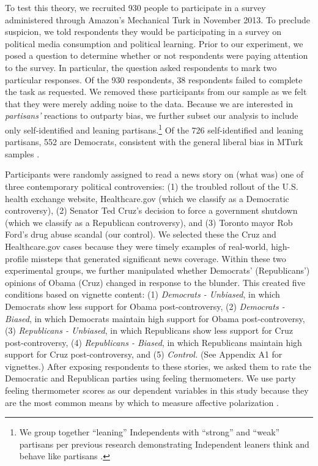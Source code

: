 \documentclass[12pt, letterpaper]{article}
\begin{document}
{To test this theory, we recruited 930 people to participate in a survey administered through Amazon's Mechanical Turk in November 2013. To preclude suspicion, we told respondents they would be participating in a survey on political media consumption and political learning. Prior to our experiment, we posed a question to determine whether or not respondents were paying attention to the survey. In particular, the question asked respondents to mark two particular responses. Of the 930 respondents, 38 respondents failed to complete the task as requested. We removed these participants from our sample as we felt that they were merely adding noise to the data. Because we are interested in \textit{partisans'} reactions to outparty bias, we further subset our analysis to include only self-identified and leaning partisans.\footnote{We group together ``leaning'' Independents with ``strong'' and ``weak'' partisans per previous research demonstrating Independent leaners think and behave like partisans \citep{keithetal_1992}.} Of the 726 self-identified and leaning partisans, 552 are Democrats, consistent with the general liberal bias in MTurk samples \citep{BerinskyHuberLenz2012}. 

Participants were randomly assigned to read a news story on (what was) one of three contemporary political controversies: (1) the troubled rollout of the U.S. health exchange website, Healthcare.gov (which we classify as a Democratic controversy), (2) Senator Ted Cruz's decision to force a government shutdown (which we classify as a Republican controversy), and (3) Toronto mayor Rob Ford's drug abuse scandal (our control). We selected these the Cruz and Healthcare.gov cases because they were timely examples of real-world, high-profile missteps that generated significant news coverage. Within these two experimental groups, we further manipulated whether Democrats' (Republicans') opinions of Obama (Cruz) changed in response to the blunder. This created five conditions based on vignette content:  (1) \textit{Democrats - Unbiased}, in which Democrats show less support for Obama post-controversy, (2) \textit{Democrats - Biased}, in which Democrats maintain high support for Obama post-controversy, (3) \textit{Republicans - Unbiased}, in which Republicans show less support for Cruz post-controversy, (4) \textit{Republicans - Biased}, in which Republicans maintain high support for Cruz post-controversy, and (5) \textit{Control.} (See Appendix A1 for vignettes.) After exposing respondents to these stories, we asked them to rate the Democratic and Republican parties using feeling thermometers. We use party feeling thermometer scores as our dependent variables in this study because they are the most common means by which to measure affective polarization \citep[e.g.,][]{haidthetherington_2012,hetheringtonrudolph_2015,IyengarSoodLelkes2012,iyengarwestwood_2014,mason_2015}. 

}
\end{document}
